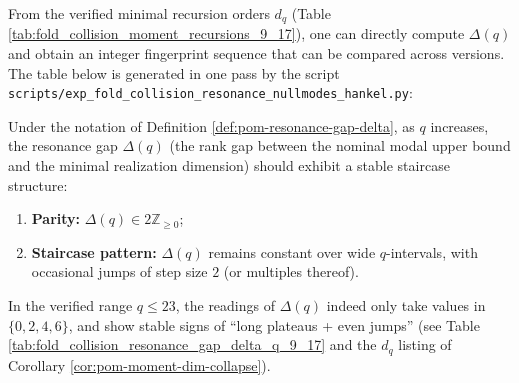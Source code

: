 \begin{remark}[Readings of \texorpdfstring{$\Delta(q)$}{Delta(q)} in the verified window (\(q=9,\dots,17\))]\label{rem:pom-delta-q9-17}
From the verified minimal recursion orders \(d_q\) (Table \ref{tab:fold_collision_moment_recursions_9_17}), one can directly compute \(\Delta(q)\) and obtain an integer fingerprint sequence that can be compared across versions.
The table below is generated in one pass by the script \texttt{scripts/exp\_fold\_collision\_resonance\_nullmodes\_hankel.py}:
\end{remark}



\begin{conjecture}\label{conj:pom-delta-staircase}
Under the notation of Definition \ref{def:pom-resonance-gap-delta}, as \(q\) increases, the resonance gap \(\Delta(q)\) (the rank gap between the nominal modal upper bound and the minimal realization dimension) should exhibit a stable staircase structure:
\begin{enumerate}
  \item \textbf{Parity:} \(\Delta(q)\in 2\mathbb{Z}_{\ge 0}\);
  \item \textbf{Staircase pattern:} \(\Delta(q)\) remains constant over wide \(q\)-intervals, with occasional jumps of step size \(2\) (or multiples thereof).
\end{enumerate}
In the verified range \(q\le 23\), the readings of \(\Delta(q)\) indeed only take values in \(\{0,2,4,6\}\), and show stable signs of ``long plateaus + even jumps'' (see Table \ref{tab:fold_collision_resonance_gap_delta_q_9_17} and the \(d_q\) listing of Corollary \ref{cor:pom-moment-dim-collapse}).
\end{conjecture}

